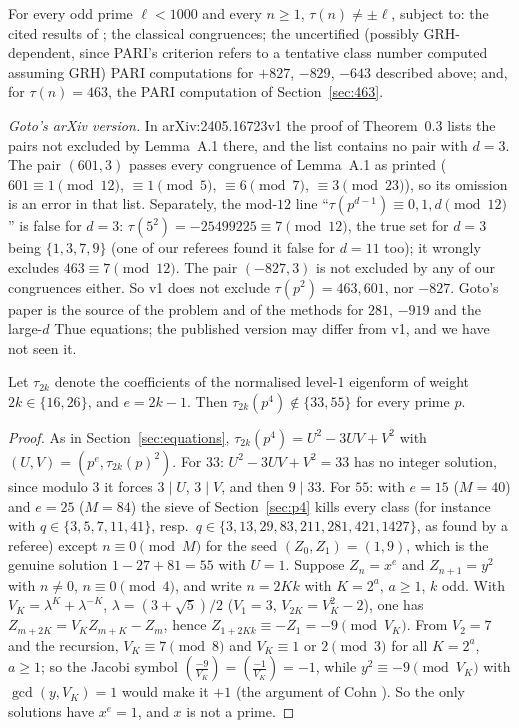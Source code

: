 \begin{corollary}\label{cor:all}
For every odd prime $\ell<1000$ and every $n\ge1$, $\tau(n)\ne\pm\ell$, subject to: the cited results of \cite{BCO,BCOT}; the classical congruences; the uncertified (possibly GRH-dependent, since PARI's criterion refers to a tentative class number computed assuming GRH) PARI computations for $+827$, $-829$, $-643$ described above; and, for $\tau(n)=463$, the PARI computation of Section~\ref{sec:463}.
\end{corollary}

\emph{Goto's arXiv version.} In arXiv:2405.16723v1 the proof of Theorem~0.3 lists the pairs not excluded by Lemma~A.1 there, and the list contains no pair with $d=3$. The pair $(601,3)$ passes every congruence of Lemma~A.1 as printed ($601\equiv1\pmod{12}$, $\equiv1\pmod5$, $\equiv6\pmod7$, $\equiv3\pmod{23}$), so its omission is an error in that list. Separately, the mod-$12$ line ``$\tau(p^{d-1})\equiv0,1,d\pmod{12}$'' is false for $d=3$: $\tau(5^2)=-25499225\equiv7\pmod{12}$, the true set for $d=3$ being $\{1,3,7,9\}$ (one of our referees found it false for $d=11$ too); it wrongly excludes $463\equiv7\pmod{12}$. The pair $(-827,3)$ is not excluded by any of our congruences either. So v1 does not exclude $\tau(p^2)=463,601$, nor $-827$. Goto's paper is the source of the problem and of the methods for $281$, $-919$ and the large-$d$ Thue equations; the published version \cite{Goto} may differ from v1, and we have not seen it.

\begin{proposition}\label{prop:HM}
Let $\tau_{2k}$ denote the coefficients of the normalised level-$1$ eigenform of weight $2k\in\{16,26\}$, and $e=2k-1$. Then $\tau_{2k}(p^4)\notin\{33,55\}$ for every prime $p$.
\end{proposition}

\begin{proof}
As in Section~\ref{sec:equations}, $\tau_{2k}(p^4)=U^2-3UV+V^2$ with $(U,V)=(p^e,\tau_{2k}(p)^2)$. For $33$: $U^2-3UV+V^2=33$ has no integer solution, since modulo $3$ it forces $3\mid U$, $3\mid V$, and then $9\mid33$. For $55$: with $e=15$ ($M=40$) and $e=25$ ($M=84$) the sieve of Section~\ref{sec:p4} kills every class (for instance with $q\in\{3,5,7,11,41\}$, resp.\ $q\in\{3,13,29,83,211,281,421,1427\}$, as found by a referee) except $n\equiv0\pmod M$ for the seed $(Z_0,Z_1)=(1,9)$, which is the genuine solution $1-27+81=55$ with $U=1$. Suppose $Z_n=x^e$ and $Z_{n+1}=y^2$ with $n\ne0$, $n\equiv0\pmod4$, and write $n=2Kk$ with $K=2^a$, $a\ge1$, $k$ odd. With $V_K=\lambda^K+\lambda^{-K}$, $\lambda=(3+\sqrt5)/2$ ($V_1=3$, $V_{2K}=V_K^2-2$), one has $Z_{m+2K}=V_KZ_{m+K}-Z_m$, hence $Z_{1+2Kk}\equiv-Z_1=-9\pmod{V_K}$. From $V_2=7$ and the recursion, $V_K\equiv7\pmod8$ and $V_K\equiv1$ or $2\pmod3$ for all $K=2^a$, $a\ge1$; so the Jacobi symbol $(\frac{-9}{V_K})=(\frac{-1}{V_K})=-1$, while $y^2\equiv-9\pmod{V_K}$ with $\gcd(y,V_K)=1$ would make it $+1$ (the argument of Cohn \cite{Cohn}). So the only solutions have $x^e=1$, and $x$ is not a prime.
\end{proof}

